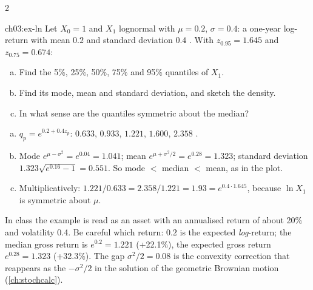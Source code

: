 \begin{paracol}{2}
\begin{tryfirst}{ch03:ex-ln}
Let $X_0=1$ and $X_1$ lognormal with $\mu=0.2$, $\sigma=0.4$: a one-year log-return with mean $0.2$ and
standard deviation $0.4$ . With $z_{0.95}=1.645$ and $z_{0.75}=0.674$:
\begin{enumerate}[(a)]
  \item Find the 5\%, 25\%, 50\%, 75\% and 95\% quantiles of $X_1$.
  \item Find its mode, mean and standard deviation, and sketch the density.
  \item In what sense are the quantiles symmetric about the median?
\end{enumerate}
\end{tryfirst}
\begin{solution}
\begin{enumerate}[(a)]
  \item $q_p=e^{0.2+0.4z_p}$: $0.633$, $0.933$, $1.221$, $1.600$, $2.358$ .
  \item Mode $e^{\mu-\sigma^2}=e^{0.04}=1.041$; mean $e^{\mu+\sigma^2/2}=e^{0.28}=1.323$; standard deviation
        $1.323\sqrt{e^{0.16}-1}=0.551$. So mode $<$ median $<$ mean, as in the plot.
  \item Multiplicatively: $1.221/0.633=2.358/1.221=1.93=e^{0.4\cdot1.645}$, because $\ln X_1$ is symmetric about $\mu$.
\end{enumerate}
In class the example is read as an asset with an annualised return of about 20\% and volatility 0.4. Be careful
which return: $0.2$ is the expected \emph{log}-return; the median gross return is $e^{0.2}=1.221$ (+22.1\%), the
expected gross return $e^{0.28}=1.323$ (+32.3\%). The gap $\sigma^2/2=0.08$ is the convexity correction that
reappears as the $-\sigma^2/2$ in the solution of the geometric Brownian motion (\cref{ch:stochcalc}).

\begin{center}


\end{center}
\end{solution}
\end{paracol}

